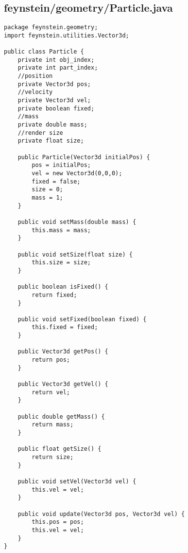 \subsection*{feynstein/geometry/Particle.java}
\begin{lstlisting}
package feynstein.geometry;
import feynstein.utilities.Vector3d;

public class Particle {
	private int obj_index;
	private int part_index;
	//position
	private Vector3d pos;
	//velocity
	private Vector3d vel;
	private boolean fixed;
	//mass
	private double mass;
	//render size
	private float size;
	
	public Particle(Vector3d initialPos) {
		pos = initialPos;
		vel = new Vector3d(0,0,0);
		fixed = false;
		size = 0;
		mass = 1;
	}
	
	public void setMass(double mass) {
		this.mass = mass;
	}
	
	public void setSize(float size) {
		this.size = size;
	}
	
	public boolean isFixed() {
		return fixed;
	}
	
	public void setFixed(boolean fixed) {
		this.fixed = fixed;
	}
	
	public Vector3d getPos() {
		return pos;
	}
	
	public Vector3d getVel() {
		return vel;
	}
	
	public double getMass() {
		return mass;
	}
	
	public float getSize() {
		return size;
	}

	public void setVel(Vector3d vel) {
	    this.vel = vel;
	}
	
	public void update(Vector3d pos, Vector3d vel) {
		this.pos = pos;
		this.vel = vel;
	}
}\end{lstlisting}

